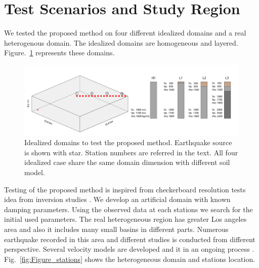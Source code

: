 \section{ Test Scenarios and Study Region}

We tested the proposed method on four different idealized domains and a real heterogenous domain. The idealized domains are homogeneous and layered. Figure.~\ref{fig:3d_domain_scenarios}  represents these domains. 

 \begin{figure}[ht]
    \centering
    \includegraphics[width=\textwidth]{figures/pdf/3d_domain_scenarios.pdf}
    \caption{Idealized domains to test the proposed method. Earthquake source is shown with star. Station numbers are referred in the text. All four idealized case share the same domain dimension with different soil model.}
    \label{fig:3d_domain_scenarios}
\end{figure}

Testing of the proposed method is inspired from checkerboard resolution tests idea from inversion studies \citep[e.g., see][]{liang2008ambient}. We develop an artificial domain with  known damping parameters. Using the observed data at each stations we search for the initial used parameters. The real heterogeneous region  has greater Los angeles area and also it includes many small basins in different parts. Numerous earthquake recorded in this area and different studies is conducted from different perspective.  Several velocity models are developed and it in an ongoing process \citep[e.g., see][]{taborda2013ground,taborda2014ground,small2017scec}. Fig.~\ref{fig:Figure_stations} shows the  heterogeneous domain and stations location. 

